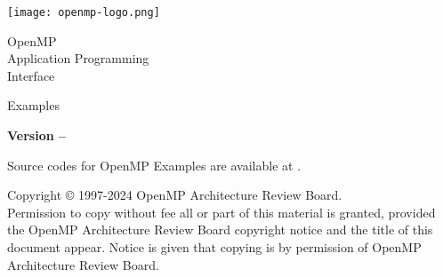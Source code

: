 
  \begin{titlepage}
    \begin{flushleft}
     \hspace{-6em} \texttt{[image: openmp-logo.png]}
    \end{flushleft}

    \begin{adjustwidth}{-0.75in}{0in}
    \begin{center}
      \Huge
      \textsf{OpenMP\\Application Programming\\Interface}

      \vspace{0.5in}\textsf{\langselect Examples}\vspace{-0.7in}
      \normalsize

      \vspace{1.0in}

      \textbf{Version \VER{} -- \VERDATE}
    \end{center}
    \end{adjustwidth}

    \vspace{2.3in} %

Source codes for OpenMP Examples \VER{} are available at
 .\\

\begin{adjustwidth}{0pt}{1em}\setlength{\parskip}{0.25\baselineskip}%
Copyright \copyright{} 1997-2024 OpenMP Architecture Review Board.\\
Permission to copy without fee all or part of this material is granted,
provided the OpenMP Architecture Review Board copyright notice and
the title of this document appear. Notice is given that copying is by
permission of OpenMP Architecture Review Board.\end{adjustwidth}

  \end{titlepage}




